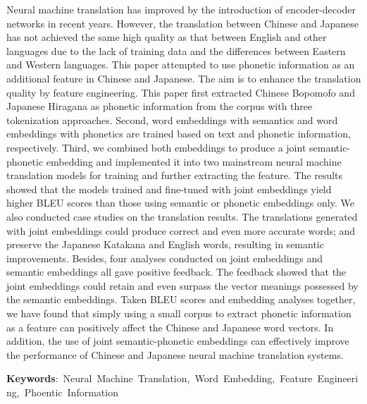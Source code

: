 Neural machine translation has improved by the introduction of encoder-decoder networks in recent years. However, the translation between Chinese and Japanese has not achieved the same high quality as that between English and other languages due to the lack of training data and the differences between Eastern and Western languages. This paper attempted to use phonetic information as an additional feature in Chinese and Japanese. The aim is to enhance the translation quality by feature engineering. This paper first extracted Chinese Bopomofo and Japanese Hiragana as phonetic information from the corpus with three tokenization approaches. Second, word embeddings with semantics and word embeddings with phonetics are trained based on text and phonetic information, respectively. Third, we combined both embeddings to produce a joint semantic-phonetic embedding and implemented it into two mainstream neural machine translation models for training and further extracting the feature. The results showed that the models trained and fine-tuned with joint embeddings yield higher BLEU scores than those using semantic or phonetic embeddings only. We also conducted case studies on the translation results. The translations generated with joint embeddings could produce correct and even more accurate words; and preserve the Japanese Katakana and English words, resulting in semantic improvements. Besides, four analyses conducted on joint embeddings and semantic embeddings all gave positive feedback. The feedback showed that the joint embeddings could retain and even surpass the vector meanings possessed by the semantic embeddings. Taken BLEU scores and embedding analyses together, we have found that simply using a small corpus to extract phonetic information as a feature can positively affect the Chinese and Japanese word vectors. In addition, the use of joint semantic-phonetic embeddings can effectively improve the performance of Chinese and Japanese neural machine translation systems.


\begin{flushleft}
\mbox{{\bf Keywords}: Neural Machine Translation, Word Embedding, Feature Engineering, Phoentic Information}
\end{flushleft}